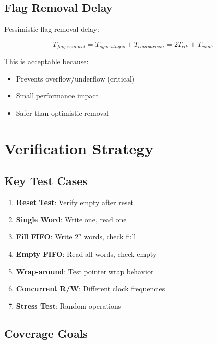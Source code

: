 \documentclass[12pt,a4paper]{article}
\begin{document}
\subsection{Flag Removal Delay}

Pessimistic flag removal delay:

\begin{equation}
T_{flag\_removal} = T_{sync\_stages} + T_{comparison} = 2T_{clk} + T_{comb}
\end{equation}

This is acceptable because:
\begin{itemize}
    \item Prevents overflow/underflow (critical)
    \item Small performance impact
    \item Safer than optimistic removal
\end{itemize}

\section{Verification Strategy}

\subsection{Key Test Cases}

\begin{enumerate}
    \item \textbf{Reset Test}: Verify empty after reset
    \item \textbf{Single Word}: Write one, read one
    \item \textbf{Fill FIFO}: Write $2^n$ words, check full
    \item \textbf{Empty FIFO}: Read all words, check empty
    \item \textbf{Wrap-around}: Test pointer wrap behavior
    \item \textbf{Concurrent R/W}: Different clock frequencies
    \item \textbf{Stress Test}: Random operations
\end{enumerate}

\subsection{Coverage Goals}
\end{document}
